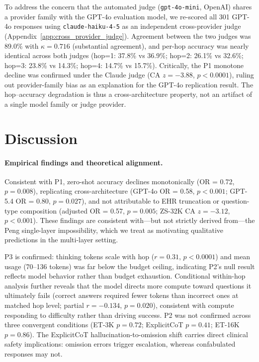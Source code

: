 \documentclass{article}
\begin{document}
To address the concern that the automated judge (\texttt{gpt-4o-mini}, OpenAI) shares a provider family with the GPT-4o evaluation model, we re-scored all 301 GPT-4o responses using \texttt{claude-haiku-4-5} as an independent cross-provider judge (Appendix~\ref{app:cross_provider_judge}). Agreement between the two judges was 89.0\% with $\kappa = 0.716$ (substantial agreement), and per-hop accuracy was nearly identical across both judges (hop=1: 37.8\% vs 36.9\%; hop=2: 26.1\% vs 32.6\%; hop=3: 23.8\% vs 14.3\%; hop=4: 14.7\% vs 15.7\%). Critically, the P1 monotone decline was confirmed under the Claude judge (CA $z = -3.88$, $p < 0.0001$), ruling out provider-family bias as an explanation for the GPT-4o replication result. The hop--accuracy degradation is thus a cross-architecture property, not an artifact of a single model family or judge provider.

\section{Discussion}

\paragraph{Empirical findings and theoretical alignment.}
Consistent with P1, zero-shot accuracy declines monotonically (OR = 0.72, $p = 0.008$), replicating cross-architecture (GPT-4o OR = 0.58, $p < 0.001$; GPT-5.4 OR = 0.80, $p = 0.027$), and not attributable to EHR truncation or question-type composition (adjusted OR = 0.57, $p = 0.005$; ZS-32K CA $z = -3.12$, $p < 0.001$). These findings are consistent with---but not strictly derived from---the Peng single-layer impossibility, which we treat as motivating qualitative predictions in the multi-layer setting.

P3 is confirmed: thinking tokens scale with hop ($r = 0.31$, $p < 0.0001$) and mean usage (70--136 tokens) was far below the budget ceiling, indicating P2's null result reflects model behavior rather than budget exhaustion. Conditional within-hop analysis further reveals that the model directs more compute toward questions it ultimately fails (correct answers required fewer tokens than incorrect ones at matched hop level; partial $r = -0.134$, $p = 0.020$), consistent with compute responding to difficulty rather than driving success. P2 was not confirmed across three convergent conditions (ET-3K $p = 0.72$; ExplicitCoT $p = 0.41$; ET-16K $p = 0.86$). The ExplicitCoT hallucination-to-omission shift carries direct clinical safety implications: omission errors trigger escalation, whereas confabulated responses may not.
\end{document}
